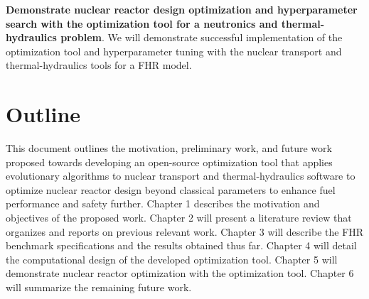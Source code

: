 \vspace{0.2cm} 
\noindent
\textbf{Demonstrate nuclear reactor design optimization and hyperparameter 
search with the optimization tool for a neutronics and thermal-hydraulics problem}.
We will demonstrate successful implementation of the optimization tool and 
hyperparameter tuning with the nuclear transport and thermal-hydraulics tools 
for a \gls{FHR} model.  


\section{Outline}
This document outlines the motivation, preliminary work, and future work proposed 
towards developing an open-source optimization tool that applies evolutionary 
algorithms to nuclear transport and thermal-hydraulics software to optimize 
nuclear reactor design beyond classical parameters to enhance fuel performance 
and safety further. 
Chapter 1 describes the motivation and objectives of the proposed work. 
Chapter 2 will present a literature review that organizes and reports on previous 
relevant work. 
Chapter 3 will describe the \gls{FHR} benchmark specifications and the results 
obtained thus far. 
Chapter 4 will detail the computational design of the developed optimization 
tool. 
Chapter 5 will demonstrate nuclear reactor optimization with the optimization 
tool.  
Chapter 6 will summarize the remaining future work. 
